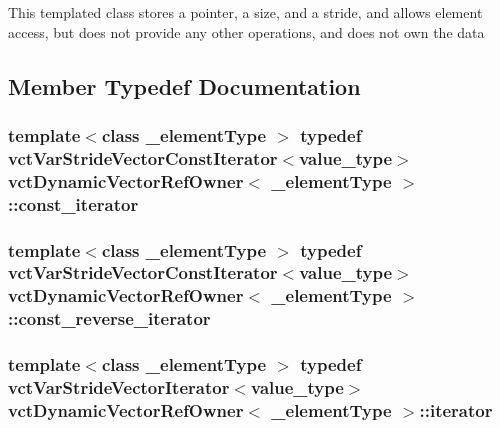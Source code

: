 This templated class stores a pointer, a size, and a stride, and allows element access, but does not provide any other operations, and does not own the data 

\subsection{Member Typedef Documentation}
\hypertarget{classvct_dynamic_vector_ref_owner_a4f7a05e13925c0eeb1d5c754c3193ba0}{}
\subsubsection[{const\+\_\+iterator}]{\setlength{\rightskip}{0pt plus 5cm}template$<$class \+\_\+element\+Type $>$ typedef {\bf vct\+Var\+Stride\+Vector\+Const\+Iterator}$<$value\+\_\+type$>$ {\bf vct\+Dynamic\+Vector\+Ref\+Owner}$<$ \+\_\+element\+Type $>$\+::{\bf const\+\_\+iterator}}\label{classvct_dynamic_vector_ref_owner_a4f7a05e13925c0eeb1d5c754c3193ba0}
\hypertarget{classvct_dynamic_vector_ref_owner_a9ab3900ecbd8f4d4eb4615a2c9a972a3}{}
\subsubsection[{const\+\_\+reverse\+\_\+iterator}]{\setlength{\rightskip}{0pt plus 5cm}template$<$class \+\_\+element\+Type $>$ typedef {\bf vct\+Var\+Stride\+Vector\+Const\+Iterator}$<$value\+\_\+type$>$ {\bf vct\+Dynamic\+Vector\+Ref\+Owner}$<$ \+\_\+element\+Type $>$\+::{\bf const\+\_\+reverse\+\_\+iterator}}\label{classvct_dynamic_vector_ref_owner_a9ab3900ecbd8f4d4eb4615a2c9a972a3}
\hypertarget{classvct_dynamic_vector_ref_owner_aaee0b96d24843f333909f2aba3aad782}{}
\subsubsection[{iterator}]{\setlength{\rightskip}{0pt plus 5cm}template$<$class \+\_\+element\+Type $>$ typedef {\bf vct\+Var\+Stride\+Vector\+Iterator}$<$value\+\_\+type$>$ {\bf vct\+Dynamic\+Vector\+Ref\+Owner}$<$ \+\_\+element\+Type $>$\+::{\bf iterator}}\label{classvct_dynamic_vector_ref_owner_aaee0b96d24843f333909f2aba3aad782}
\hypertarget{classvct_dynamic_vector_ref_owner_a3949acd3baa131459d464b058d249990}{}
